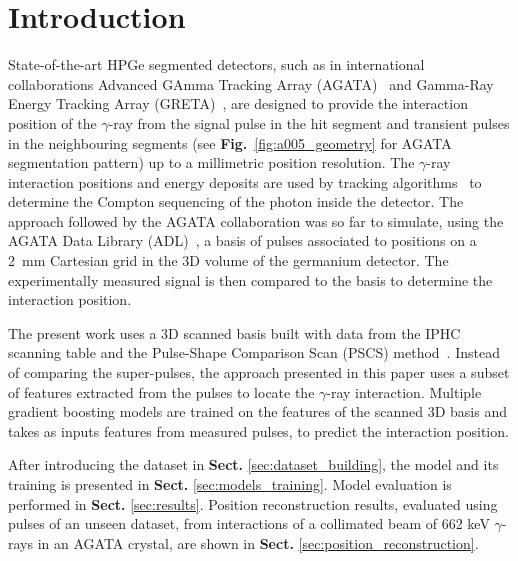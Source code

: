 \section{Introduction}
\label{sec:intro}
State-of-the-art HPGe segmented detectors, such as in international collaborations Advanced GAmma Tracking Array (AGATA)~\cite{Akkoyun2012} and Gamma-Ray Energy Tracking Array (GRETA)~\cite{Lee2003DevelopmentsArrays}, are designed to provide the interaction position of the $\gamma$-ray from the signal pulse in the hit segment and transient pulses in the neighbouring segments (see \textbf{Fig.}~\ref{fig:a005_geometry} for AGATA segmentation pattern) up to a millimetric position resolution. The $\gamma$-ray interaction positions and energy deposits are used by tracking algorithms~\cite{Bazzacco:2004nnw,Lopez-Martens2004}  to determine the Compton sequencing of the photon inside the detector. The approach followed by the AGATA collaboration was so far to simulate, using the AGATA Data Library (ADL)~\cite{Bruyneel2016ADL}, a basis of pulses associated to positions on a 2~mm Cartesian grid in the 3D volume of the germanium detector. The experimentally measured signal is then compared to the basis to determine the interaction position.

The present work uses a 3D scanned basis built with data from the IPHC scanning table and the Pulse-Shape Comparison Scan (PSCS) method~\cite{Crespi2008}. Instead of comparing the super-pulses, the approach presented in this paper uses a subset of features extracted from the pulses to locate the $\gamma$-ray interaction. Multiple gradient boosting models are trained on the features of the scanned 3D basis and takes as inputs features from measured pulses, to predict the interaction position.

After introducing the dataset in \textbf{Sect.} \ref{sec:dataset_building}, the model and its training is presented in \textbf{Sect. }\ref{sec:models_training}. Model evaluation is performed in \textbf{Sect.} \ref{sec:results}. Position reconstruction results, evaluated using pulses of an unseen dataset, from interactions of a collimated beam of 662 keV $\gamma$-rays in an AGATA crystal, are shown in \textbf{Sect.} \ref{sec:position_reconstruction}.

